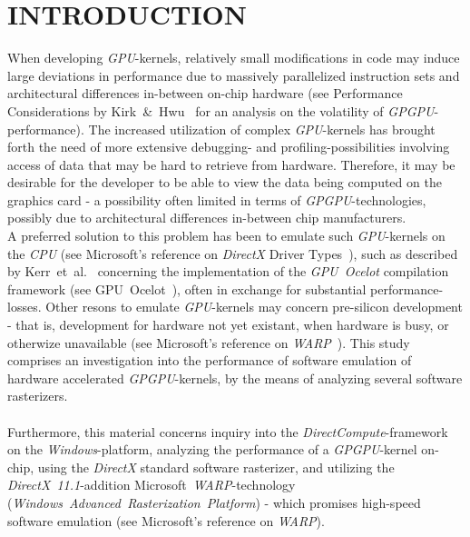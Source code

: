 
\section{INTRODUCTION}
\label{sec:introduction}
When developing \textit{GPU}-kernels, relatively small modifications in code may induce large deviations in performance due to massively parallelized instruction sets and architectural differences in-between on-chip hardware (see Performance Considerations by Kirk~\&~Hwu~\cite[ch.~6]{Kirk:2010:PMP:1841511} for an analysis on the volatility of \textit{GPGPU}-performance).
The increased utilization of complex \textit{GPU}-kernels has brought forth the need of more extensive debugging- and profiling-possibilities involving access of data that may be hard to retrieve from hardware.
Therefore, it may be desirable for the developer to be able to view the data being computed on the graphics card - a possibility often limited in terms of \textit{GPGPU}-technologies, possibly due to architectural differences in-between chip manufacturers.\\
A preferred solution to this problem has been to emulate such \textit{GPU}-kernels on the \textit{CPU} (see Microsoft's reference on \textit{DirectX} Driver Types~), such as described by Kerr~et~al.~\cite[p.~416-419]{Hwu:2011:GCG:2103614} concerning the implementation of the \textit{GPU~Ocelot} compilation framework (see GPU~Ocelot~), often in exchange for substantial performance-losses.
Other resons to emulate \textit{GPU}-kernels may concern pre-silicon development - that is, development for hardware not yet existant, when hardware is busy, or otherwize unavailable (see Microsoft's reference on \textit{WARP}~).
This study comprises an investigation into the performance of software emulation of hardware accelerated \textit{GPGPU}-kernels, by the means of analyzing several software rasterizers.\\
\\
Furthermore, this material concerns inquiry into the \textit{DirectCompute}-framework on the \textit{Windows}-platform, analyzing the performance of a \textit{GPGPU}-kernel on-chip, using the \textit{DirectX} standard software rasterizer, and utilizing the \textit{DirectX~11.1}-addition Microsoft~\textit{WARP}-technology (\textit{Windows~Advanced~Rasterization~Platform}) - which promises high-speed software emulation (see Microsoft's reference on \textit{WARP}).\\
